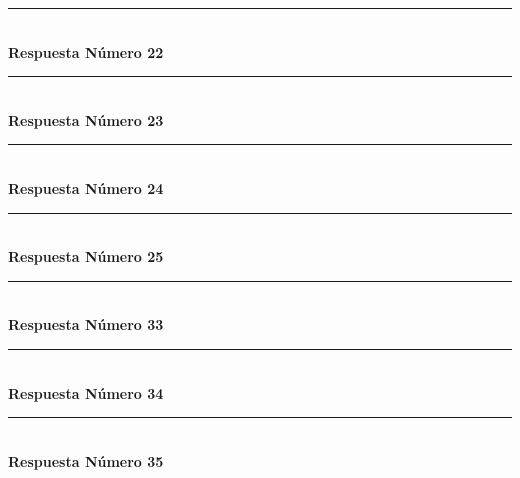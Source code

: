 \documentclass{article}
\begin{document}
\noindent\rule{\textwidth}{1pt} \\
\textbf{Respuesta Número 22} \\

\noindent\rule{\textwidth}{1pt} \\
\textbf{Respuesta Número 23} \\

\noindent\rule{\textwidth}{1pt} \\
\textbf{Respuesta Número 24} \\

\noindent\rule{\textwidth}{1pt} \\
\textbf{Respuesta Número 25} \\

\noindent\rule{\textwidth}{1pt} \\
\textbf{Respuesta Número 33} \\

\noindent\rule{\textwidth}{1pt} \\
\textbf{Respuesta Número 34} \\

\noindent\rule{\textwidth}{1pt} \\
\textbf{Respuesta Número 35} \\
\end{document}
